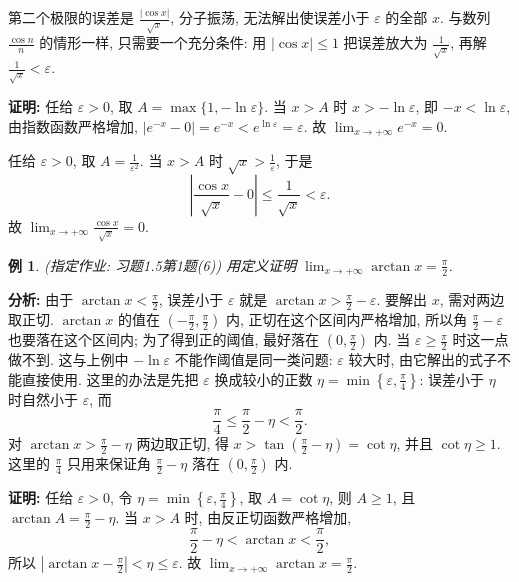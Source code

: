 \documentclass[UTF8,openany]{ctexbook}
\theoremstyle{chinesetextbook}
\newtheorem{example}{例}[section]
\newenvironment{cnproof}{\par\indent\textbf{证明:} \ignorespaces}{\par}
\begin{document}
第二个极限的误差是 $\displaystyle\frac{|\cos x|}{\sqrt x}$, 分子振荡, 无法解出使误差小于 $\varepsilon$ 的全部 $x$. 与数列 $\displaystyle\frac{\cos n}n$ 的情形一样, 只需要一个充分条件: 用 $|\cos x|\le1$ 把误差放大为 $\displaystyle\frac1{\sqrt x}$, 再解 $\displaystyle\frac1{\sqrt x}<\varepsilon$.
\begin{cnproof}
任给 $\varepsilon>0$, 取 $A=\max\{1,-\ln\varepsilon\}$. 当 $x>A$ 时 $x>-\ln\varepsilon$, 即 $-x<\ln\varepsilon$, 由指数函数严格增加, $|e^{-x}-0|=e^{-x}<e^{\ln\varepsilon}=\varepsilon$. 故 $\displaystyle\lim_{x\to+\infty}e^{-x}=0$.

任给 $\varepsilon>0$, 取 $\displaystyle A=\frac1{\varepsilon^2}$. 当 $x>A$ 时 $\displaystyle\sqrt x>\frac1\varepsilon$, 于是
\[
\left|\frac{\cos x}{\sqrt x}-0\right|\le\frac1{\sqrt x}<\varepsilon.
\]
故 $\displaystyle\lim_{x\to+\infty}\frac{\cos x}{\sqrt x}=0$.
\end{cnproof}
\begin{example}
\textnormal{(指定作业: 习题1.5第1题(6))} 用定义证明 $\displaystyle\lim_{x\to+\infty}\arctan x=\frac\pi2$.
\end{example}
\par\indent\textbf{分析:} 由于 $\displaystyle\arctan x<\frac\pi2$, 误差小于 $\varepsilon$ 就是 $\displaystyle\arctan x>\frac\pi2-\varepsilon$. 要解出 $x$, 需对两边取正切. $\arctan x$ 的值在 $\displaystyle\left(-\frac\pi2,\frac\pi2\right)$ 内, 正切在这个区间内严格增加, 所以角 $\displaystyle\frac\pi2-\varepsilon$ 也要落在这个区间内; 为了得到正的阈值, 最好落在 $\displaystyle\left(0,\frac\pi2\right)$ 内. 当 $\displaystyle\varepsilon\ge\frac\pi2$ 时这一点做不到. 这与上例中 $-\ln\varepsilon$ 不能作阈值是同一类问题: $\varepsilon$ 较大时, 由它解出的式子不能直接使用. 这里的办法是先把 $\varepsilon$ 换成较小的正数 $\displaystyle\eta=\min\left\{\varepsilon,\frac\pi4\right\}$: 误差小于 $\eta$ 时自然小于 $\varepsilon$, 而
\[
\frac\pi4\le\frac\pi2-\eta<\frac\pi2.
\]
对 $\displaystyle\arctan x>\frac\pi2-\eta$ 两边取正切, 得 $\displaystyle x>\tan\left(\frac\pi2-\eta\right)=\cot\eta$, 并且 $\cot\eta\ge1$. 这里的 $\displaystyle\frac\pi4$ 只用来保证角 $\displaystyle\frac\pi2-\eta$ 落在 $\displaystyle\left(0,\frac\pi2\right)$ 内.
\begin{cnproof}
任给 $\varepsilon>0$, 令 $\displaystyle\eta=\min\left\{\varepsilon,\frac\pi4\right\}$, 取 $A=\cot\eta$, 则 $A\ge1$, 且 $\displaystyle\arctan A=\frac\pi2-\eta$. 当 $x>A$ 时, 由反正切函数严格增加,
\[
\frac\pi2-\eta<\arctan x<\frac\pi2,
\]
所以 $\displaystyle\left|\arctan x-\frac\pi2\right|<\eta\le\varepsilon$. 故 $\displaystyle\lim_{x\to+\infty}\arctan x=\frac\pi2$.
\end{cnproof}
\end{document}

